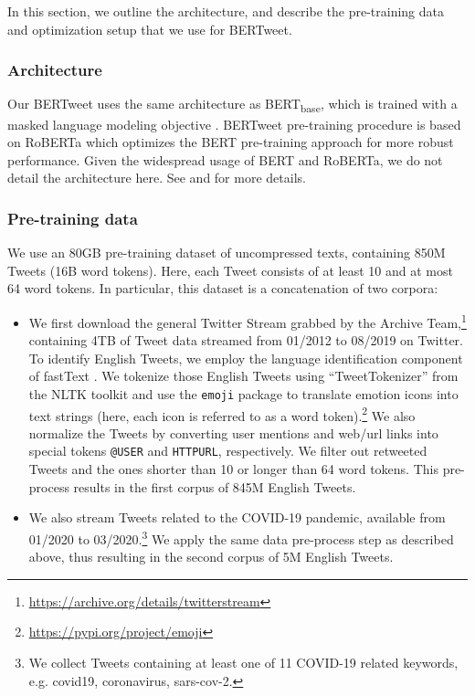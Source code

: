 \documentclass[11pt,a4paper]{article}
\begin{document}
In this section, we outline the architecture, and describe the pre-training data and optimization setup that we use for BERTweet.

\subsubsection*{Architecture} 
Our  BERTweet uses the same  architecture  as BERT\textsubscript{base}, which is trained with a masked language modeling objective  \citep{devlin-etal-2019-bert}. BERTweet pre-training procedure is based on RoBERTa \citep{RoBERTa} which optimizes the BERT pre-training approach for more robust performance. Given the widespread usage of BERT and RoBERTa, we do not detail the architecture here. See  and  for more details. 

\subsubsection*{Pre-training data}
We use an 80GB pre-training dataset of uncompressed texts, containing 850M Tweets (16B word tokens). Here, each Tweet consists of at least 10 and at most 64 word tokens. In particular, this dataset is a concatenation of two corpora: 

\begin{itemize}[leftmargin=*]
\setlength\itemsep{-1pt}

\item We first download the general Twitter Stream grabbed by the Archive Team,\footnote{\url{https://archive.org/details/twitterstream}} containing 4TB of Tweet data streamed from 01/2012 to 08/2019 on Twitter. To identify English Tweets, we employ the language identification component of fastText \citep{joulin-etal-2017-bag}.  We tokenize those English Tweets using ``TweetTokenizer'' from the NLTK toolkit \citep{bird_natural_2009} and use the \texttt{emoji} package to translate emotion icons into text strings (here, each icon is referred to as a word token).\footnote{\url{https://pypi.org/project/emoji}}  We also normalize the Tweets by converting user mentions and web/url links into special tokens \texttt{@USER} and \texttt{HTTPURL}, respectively. We filter out retweeted Tweets and the ones shorter than 10 or longer than 64 word tokens. This pre-process results in the first corpus of 845M English Tweets. 

\item We also stream Tweets related to the COVID-19 pandemic, available from 01/2020 to 03/2020.\footnote{We collect Tweets containing at least one of 11 COVID-19 related keywords, e.g. covid19, coronavirus, sars-cov-2.} We apply the same data pre-process step as described above, thus resulting in the second corpus of 5M English Tweets.

\end{itemize}
\end{document}
